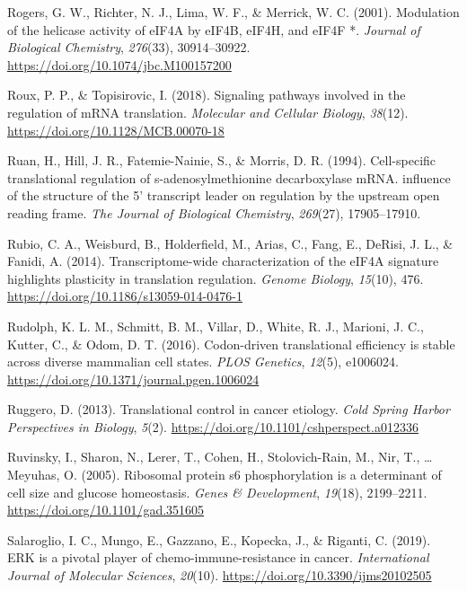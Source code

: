 \documentclass[12pt,openany]{book}
\begin{document}
\hypertarget{ref-Rogers2001}{}
Rogers, G. W., Richter, N. J., Lima, W. F., \& Merrick, W. C. (2001).
Modulation of the helicase activity of eIF4A by eIF4B, eIF4H, and eIF4F
*. \emph{Journal of Biological Chemistry}, \emph{276}(33), 30914--30922.
\url{https://doi.org/10.1074/jbc.M100157200}

\hypertarget{ref-Roux2018}{}
Roux, P. P., \& Topisirovic, I. (2018). Signaling pathways involved in
the regulation of mRNA translation. \emph{Molecular and Cellular
Biology}, \emph{38}(12). \url{https://doi.org/10.1128/MCB.00070-18}

\hypertarget{ref-Ruan1994}{}
Ruan, H., Hill, J. R., Fatemie-Nainie, S., \& Morris, D. R. (1994).
Cell-specific translational regulation of s-adenosylmethionine
decarboxylase mRNA. influence of the structure of the 5' transcript
leader on regulation by the upstream open reading frame. \emph{The
Journal of Biological Chemistry}, \emph{269}(27), 17905--17910.

\hypertarget{ref-Rubio2014}{}
Rubio, C. A., Weisburd, B., Holderfield, M., Arias, C., Fang, E.,
DeRisi, J. L., \& Fanidi, A. (2014). Transcriptome-wide characterization
of the eIF4A signature highlights plasticity in translation regulation.
\emph{Genome Biology}, \emph{15}(10), 476.
\url{https://doi.org/10.1186/s13059-014-0476-1}

\hypertarget{ref-Rudolph2016}{}
Rudolph, K. L. M., Schmitt, B. M., Villar, D., White, R. J., Marioni, J.
C., Kutter, C., \& Odom, D. T. (2016). Codon-driven translational
efficiency is stable across diverse mammalian cell states. \emph{PLOS
Genetics}, \emph{12}(5), e1006024.
\url{https://doi.org/10.1371/journal.pgen.1006024}

\hypertarget{ref-Ruggero2013}{}
Ruggero, D. (2013). Translational control in cancer etiology. \emph{Cold
Spring Harbor Perspectives in Biology}, \emph{5}(2).
\url{https://doi.org/10.1101/cshperspect.a012336}

\hypertarget{ref-Ruvinsky2005}{}
Ruvinsky, I., Sharon, N., Lerer, T., Cohen, H., Stolovich-Rain, M., Nir,
T., \ldots{} Meyuhas, O. (2005). Ribosomal protein s6 phosphorylation is
a determinant of cell size and glucose homeostasis. \emph{Genes \&
Development}, \emph{19}(18), 2199--2211.
\url{https://doi.org/10.1101/gad.351605}

\hypertarget{ref-Salaroglio2019}{}
Salaroglio, I. C., Mungo, E., Gazzano, E., Kopecka, J., \& Riganti, C.
(2019). ERK is a pivotal player of chemo-immune-resistance in cancer.
\emph{International Journal of Molecular Sciences}, \emph{20}(10).
\url{https://doi.org/10.3390/ijms20102505}
\end{document}
